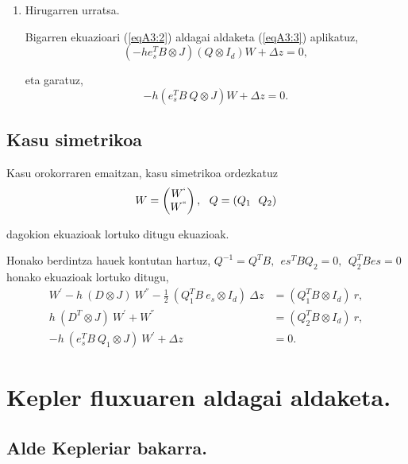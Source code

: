 \begin{enumerate}
\item Hirugarren urratsa.

Bigarren ekuazioari (\ref{eqA3:2}) aldagai aldaketa (\ref{eqA3:3}) aplikatuz,
\begin{equation*}
(- h e_s^T B \otimes J) (Q \otimes I_d) W + \Delta z =0, 
\end{equation*}

eta garatuz,
\begin{equation*}
- h (e_s^T 
B \ Q \otimes J) W +\Delta z =0.
\end{equation*}

\end{enumerate}

\subsection*{Kasu simetrikoa}
\label{serans:B32}

Kasu orokorraren emaitzan, kasu simetrikoa ordezkatuz 
\begin{align*}
W=\left(
\begin{matrix}
W^{`} \\
W^{``} 
\end{matrix}
\right), \ \ Q=(Q_1 \ \ Q_2)
\end{align*}

dagokion ekuazioak lortuko ditugu ekuazioak.

Honako berdintza hauek kontutan hartuz, $Q^{-1}=Q^TB, \ \ es^TBQ_2=0, \ \ Q_2^TBes=0$ honako ekuazioak lortuko ditugu,
\begin{align*}
 W^{'}-h \ (D \otimes J) \ W^{''} -\frac{1}{2}\ (Q_1^T B \ e_s \otimes I_d) \ \Delta z &= (Q_1^T B \otimes I_d) \ r,\\
 h \ (D^T \otimes J) \ W^{'}+W^{''} &= (Q_2^T B \otimes I_d) \ r, \\
  - h \ (e_s^T B \ Q_1 \otimes J) \ W^{'} + \Delta z &=0. 
\end{align*}

\section{Kepler fluxuaren aldagai aldaketa.}
\label{eransB4}


\subsection*{Alde Kepleriar bakarra.}


